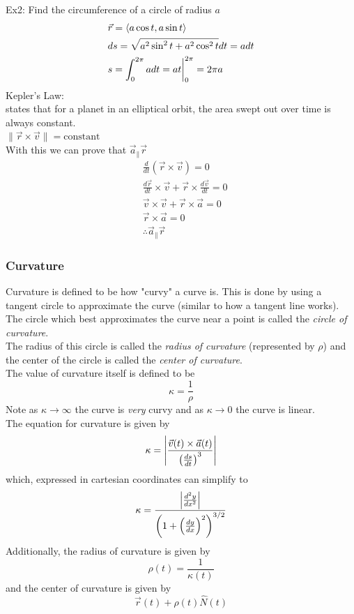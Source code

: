 \documentclass[11pt, fleqn]{article}
\begin{document}
Ex2: Find the circumference of a circle of radius $a$
\begin{align*}
    &\vec{r}=\left\langle a\cos t,a\sin t \right\rangle\\
    &ds=\sqrt{a^2\sin^2t+a^2\cos^2t}dt=adt\\
    &s=\int_0^{2\pi}adt=at\bigg\vert_0^{2\pi}=2\pi a
\end{align*}
Kepler's Law:\\
states that for a planet in an elliptical orbit, the area swept out over time is always constant.\\
$\|\vec{r}\times\vec{v}\|=\text{constant}$\\
With this we can prove that $\vec{a}_\parallel\vec{r}$
\begin{align*}
    &\frac{d}{dt}(\vec{r}\times\vec{v})=0\\
    &\frac{d\vec{r}}{dt}\times\vec{v}+\vec{r}\times\frac{d\vec{v}}{dt}=0\\
    &\vec{v}\times\vec{v}+\vec{r}\times\vec{a}=0\\
    &\vec{r}\times\vec{a}=0\\
    &\therefore\vec{a}_\parallel\vec{r}
\end{align*}

\subsubsection{Curvature}
Curvature is defined to be how "curvy" a curve is. This is done by using a tangent circle to approximate the curve (similar to how a tangent line works).\\
The circle which best approximates the curve near a point is called the \textit{circle of curvature}.\\
The radius of this circle is called the \textit{radius of curvature} (represented by $\rho$) and the center of the circle is called the \textit{center of curvature}.\\
The value of curvature itself is defined to be
$$\kappa=\frac{1}{\rho}$$
Note as $\kappa\to\infty$ the curve is \textit{very} curvy and as $\kappa\to0$ the curve is linear.\\
The equation for curvature is given by
$$\kappa=\left| \frac{\vec{v}(t)\times\vec{a}(t)}{\left( \frac{ds}{dt} \right)^3} \right|$$
which, expressed in cartesian coordinates can simplify to
$$\kappa=\frac{\left| \frac{d^2y}{dx^2} \right|}{\left( 1+\left( \frac{dy}{dx} \right)^2 \right)^{3/2}}$$
Additionally, the radius of curvature is given by
$$\rho(t)=\frac{1}{\kappa(t)}$$
and the center of curvature is given by
$$\vec{r}(t)+\rho(t)\hat{N}(t)$$
\end{document}
